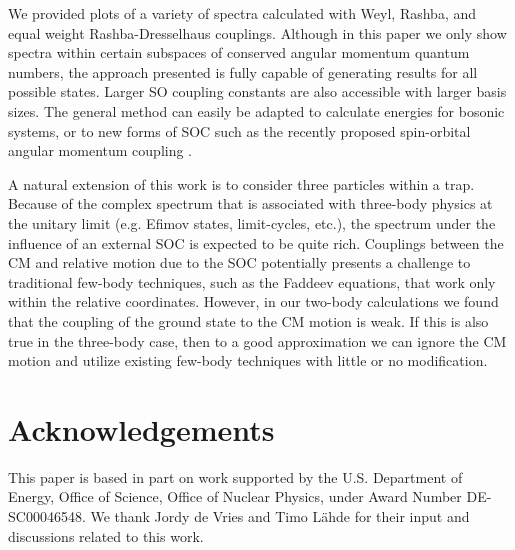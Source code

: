 \documentclass[%
 notitlepage,
 preprint,
showpacs,%
 amsmath,amssymb,
 aps,
pra,
]{revtex4-1}
\begin{document}
We provided plots of a variety of spectra calculated with Weyl, Rashba, and equal weight Rashba-Dresselhaus couplings.  Although in this paper we only show spectra within certain subspaces of conserved angular momentum quantum numbers, the approach presented is fully capable of generating results for all possible states. Larger SO coupling constants are also accessible with larger basis sizes. The general method can easily be adapted to calculate energies for bosonic systems, or to new forms of SOC such as the recently proposed spin-orbital angular momentum coupling \cite{2014arXiv1411.1737S}.

A natural extension of this work is to consider three particles within a trap.  Because of the complex spectrum that is associated with three-body physics at the unitary limit (e.g. Efimov states, limit-cycles, etc.), the spectrum under the influence of an external SOC is expected to be quite rich.  Couplings between the CM and relative motion due to the SOC potentially presents a challenge to traditional few-body techniques, such as the Faddeev equations, that work only within the relative coordinates.  However, in our two-body calculations we found that the coupling of the ground state to the CM motion is weak. If this is also true in the three-body case, then to a good approximation we can ignore the CM motion and utilize existing few-body techniques with little or no modification.  

\section*{Acknowledgements}
This paper is based in part on work supported by the U.S. Department of Energy, Office of Science, Office of Nuclear Physics, under Award Number DE-SC00046548. We thank Jordy de Vries and Timo L{\"a}hde for their input and discussions related to this work.   



\appendix*
\end{document}
